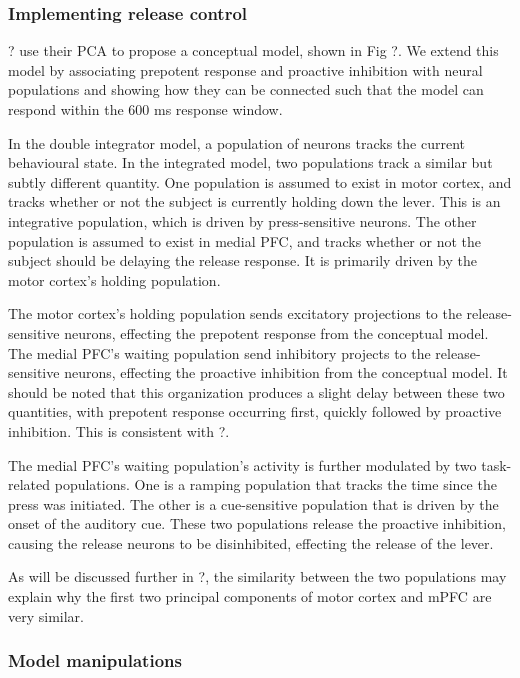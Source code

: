 \documentclass[12pt]{article}
\begin{document}
\subsubsection{Implementing release control}

? %
use their PCA to propose a conceptual model,
shown in Fig ?. %
We extend this model
by associating prepotent response and proactive inhibition
with neural populations and
showing how they can be connected
such that the model can respond
within the 600 ms response window.

In the double integrator model,
a population of neurons tracks the current behavioural state.
In the integrated model, two populations
track a similar but subtly different quantity.
One population is assumed to exist
in motor cortex, and tracks whether or not
the subject is currently holding down the lever.
This is an integrative population,
which is driven by press-sensitive neurons.
The other population is assumed to exist
in medial PFC, and tracks whether or not
the subject should be delaying the release response.
It is primarily driven by the motor cortex's
holding population.

The motor cortex's holding population
sends excitatory projections
to the release-sensitive neurons,
effecting the prepotent response from the conceptual model.
The medial PFC's waiting population
send inhibitory projects
to the release-sensitive neurons,
effecting the proactive inhibition from the conceptual model.
It should be noted that this organization
produces a slight delay between these two quantities,
with prepotent response occurring first,
quickly followed by proactive inhibition.
This is consistent with ?. %

The medial PFC's waiting population's activity
is further modulated by two task-related populations.
One is a ramping population that tracks
the time since the press was initiated.
The other is a cue-sensitive population
that is driven by the onset of the auditory cue.
These two populations
release the proactive inhibition,
causing the release neurons to be disinhibited,
effecting the release of the lever.

As will be discussed further in ?, %
the similarity between the two populations
may explain why the first two principal components
of motor cortex and mPFC are very similar.

\subsubsection{Model manipulations}
\end{document}
